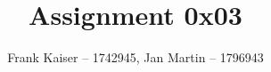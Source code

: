 \documentclass{article}
\begin{document}
\title{Assignment 0x03}
\author{Frank Kaiser -- 1742945, Jan Martin -- 1796943}

\maketitle

\tableofcontents



\end{document}
